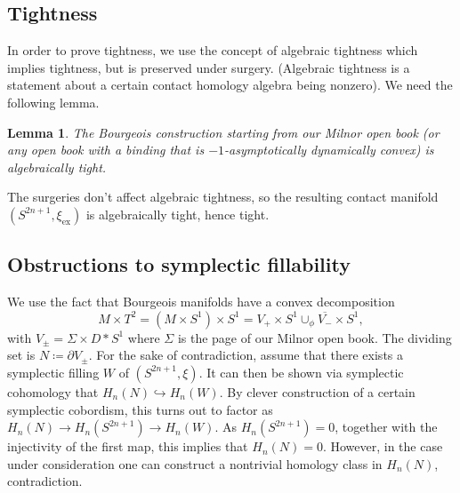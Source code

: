 \documentclass{amsart}
\newtheorem{lemma}{Lemma}
\newtheorem{definition}{Definition}
\begin{document}
\subsection*{Tightness}

In order to prove tightness, we use the concept of algebraic tightness which implies tightness,
but is preserved under surgery.
(Algebraic tightness is a statement about a certain contact homology algebra being nonzero).
We need the following lemma.
\begin{lemma}
    The Bourgeois construction starting from our Milnor open book
    (or any open book with a binding that is $-1$-asymptotically dynamically convex) 
    is algebraically tight.
\end{lemma}
The surgeries don't affect algebraic tightness, so the resulting
contact manifold $(S^{2n+1}, \xi_\mathrm{ex})$ is algebraically tight, hence tight.


\subsection*{Obstructions to symplectic fillability}
We use the fact that Bourgeois manifolds have a convex decomposition
\[
    M \times T^2 = (M \times S^1) \times S^1 = V_+ \times S^1 \cup_\phi \overline{V_-} \times S^1,  
\]
with $V_{\pm} = \Sigma \times D*S^1$ where $\Sigma$ is the page of our Milnor open book.
The dividing set is $N \coloneqq \partial V_{\pm}$.
For the sake of contradiction, assume that there exists a symplectic filling $W$ of $(S^{2n+1}, \xi)$.
It can then be shown via symplectic cohomology that $H_n(N) \hookrightarrow H_n(W)$.
By clever construction of a certain symplectic cobordism, this turns out to factor
as $H_n(N) \to H_n(S^{2n+1}) \to H_n(W)$.
As $H_n(S^{2n+1}) = 0$, together with the injectivity of the first map,
this implies that $H_n(N) = 0$.
However, in the case under consideration one can construct a nontrivial homology class
in $H_n(N)$, contradiction.



\end{document}
